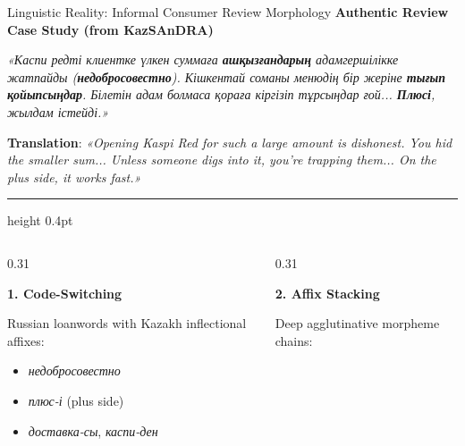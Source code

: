 \documentclass[aspectratio=169, 10pt]{beamer}
\newcommand{\subhead}[1]{{\normalsize\textbf{\color{DarkNavy}#1}\par\vspace{3pt}}}
\begin{document}
\begin{frame}{Linguistic Reality: Informal Consumer Review Morphology}
    \vspace*{0.2cm}
    {\small\textbf{\color{DarkNavy}Authentic Review Case Study (from KazSAnDRA)}}\par\vspace{2pt}
    {\footnotesize\textit{«Каспи редті клиентке үлкен суммаға \textbf{ашқызғандарың} адамгершілікке жатпайды (\textbf{недобросовестно}). Кішкентай соманы менюдің бір жеріне \textbf{тығып қойыпсыңдар}. Білетін адам болмаса қораға кіргізіп тұрсыңдар ғой... \textbf{Плюсі}, жылдам істейді.»}}\par\vspace{3pt}
    {\scriptsize\color{SlateText}\textbf{Translation}: \textit{«Opening Kaspi Red for such a large amount is dishonest. You hid the smaller sum... Unless someone digs into it, you're trapping them... On the plus side, it works fast.»}}\par
    \vspace{0.25cm}
    {\color{BorderGray}\hrule height 0.4pt}\par
    \vspace{0.25cm}
    \begin{columns}[T]
        \begin{column}{0.31\textwidth}
            \subhead{1. Code-Switching}
            {\footnotesize Russian loanwords with Kazakh inflectional affixes:\par\vspace{2pt}}
            \begin{itemize}\setlength{\itemsep}{1pt}\footnotesize
                \item \textit{недобросовестно}
                \item \textit{плюс-і} (plus side)
                \item \textit{доставка-сы}, \textit{каспи-ден}
            \end{itemize}
        \end{column}
        \begin{column}{0.31\textwidth}
            \subhead{2. Affix Stacking}
            {\footnotesize Deep agglutinative morpheme chains:\par\vspace{2pt}}
            \begin{itemize}\setlength{\itemsep}{1pt}\footnotesize

\end{itemize}
\end{column}
\end{columns}
\end{frame}
\end{document}
